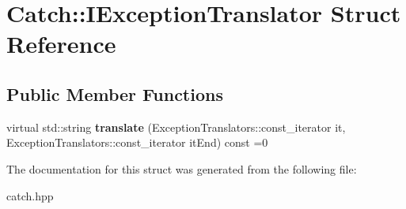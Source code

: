 \hypertarget{structCatch_1_1IExceptionTranslator}{}\section{Catch\+::I\+Exception\+Translator Struct Reference}
\label{structCatch_1_1IExceptionTranslator}
\subsection*{Public Member Functions}
\begin{DoxyCompactItemize}
\item 
\mbox{\label{structCatch_1_1IExceptionTranslator_a2a554b96ed5ed411e7c796b6b42837a5}} 
virtual std\+::string {\bfseries translate} (Exception\+Translators\+::const\+\_\+iterator it, Exception\+Translators\+::const\+\_\+iterator it\+End) const =0
\end{DoxyCompactItemize}


The documentation for this struct was generated from the following file\+:\begin{DoxyCompactItemize}
\item 
catch.\+hpp\end{DoxyCompactItemize}
